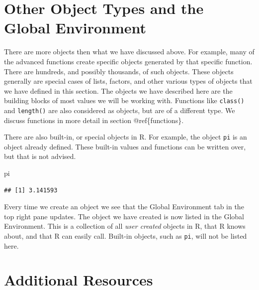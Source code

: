 \documentclass[
]{book}
\newenvironment{Shaded}{\begin{snugshade}}{\end{snugshade}}
\newcommand{\NormalTok}[1]{#1}
\begin{document}
\hypertarget{other-object-types-and-the-global-environment}{%
\section{Other Object Types and the Global Environment}\label{other-object-types-and-the-global-environment}}

There are more objects then what we have discussed above. For example, many of the advanced functions create specific objects generated by that specific function. There are hundreds, and possibly thousands, of such objects. These objects generally are special cases of lists, factors, and other various types of objects that we have defined in this section. The objects we have described here are the building blocks of most values we will be working with. Functions like \texttt{class()} and \texttt{length()} are also considered as objects, but are of a different type. We discuss functions in more detail in section @ref\{functions\}.

There are also built-in, or special objects in R. For example, the object \texttt{pi} is an object already defined. These built-in values and functions can be written over, but that is not advised.

\begin{Shaded}
\begin{Highlighting}[]
\NormalTok{pi}
\end{Highlighting}
\end{Shaded}

\begin{verbatim}
## [1] 3.141593
\end{verbatim}

Every time we create an object we see that the Global Environment tab in the top right pane updates. The object we have created is now listed in the Global Environment. This is a collection of all \emph{user created} objects in R, that R knows about, and that R can easily call. Built-in objects, such as \texttt{pi}, will not be listed here.

\hypertarget{additional-resources-1}{%
\section{Additional Resources}\label{additional-resources-1}}
\end{document}
